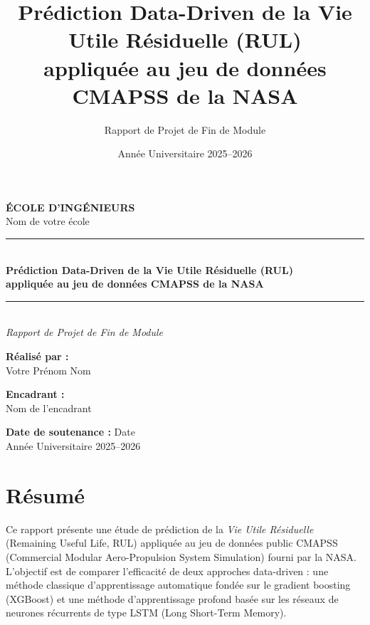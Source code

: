 \documentclass[12pt,a4paper]{report}
\title{\textbf{Prédiction Data-Driven de la Vie Utile Résiduelle (RUL)\\
appliquée au jeu de données CMAPSS de la NASA}}
\author{Rapport de Projet de Fin de Module}
\date{Année Universitaire 2025--2026}
\theoremstyle{definition}
\begin{document}
\begin{titlepage}
    \centering
    \vspace*{1cm}
    
    {\Large \textbf{ÉCOLE D'INGÉNIEURS}}\\[0.3cm]
    {\large Nom de votre école}\\[1.5cm]
    
    \rule{\linewidth}{0.5mm}\\[0.6cm]
    {\Huge \bfseries Prédiction Data-Driven de la Vie Utile Résiduelle (RUL)}\\[0.3cm]
    {\LARGE \bfseries appliquée au jeu de données CMAPSS de la NASA}\\[0.2cm]
    \rule{\linewidth}{0.5mm}\\[1.5cm]
    
    {\Large \textit{Rapport de Projet de Fin de Module}}\\[1cm]
    
    \vfill
    
    \begin{minipage}{0.45\textwidth}
        \begin{flushleft}
            \textbf{Réalisé par :}\\
            Votre Prénom Nom
        \end{flushleft}
    \end{minipage}
    \hfill
    \begin{minipage}{0.45\textwidth}
        \begin{flushright}
            \textbf{Encadrant :}\\
            Nom de l'encadrant
        \end{flushright}
    \end{minipage}
    
    \vspace{1cm}
    {\large \textbf{Date de soutenance :} Date}\\[0.5cm]
    {\large Année Universitaire 2025--2026}
    
\end{titlepage}

\chapter*{Résumé}

Ce rapport présente une étude de prédiction de la \emph{Vie Utile Résiduelle} (Remaining Useful Life, RUL) appliquée au jeu de données public \textsc{CMAPSS} (Commercial Modular Aero-Propulsion System Simulation) fourni par la NASA. L'objectif est de comparer l'efficacité de deux approches data-driven : une méthode classique d'apprentissage automatique fondée sur le gradient boosting (XGBoost) et une méthode d'apprentissage profond basée sur les réseaux de neurones récurrents de type LSTM (Long Short-Term Memory).
\end{document}
